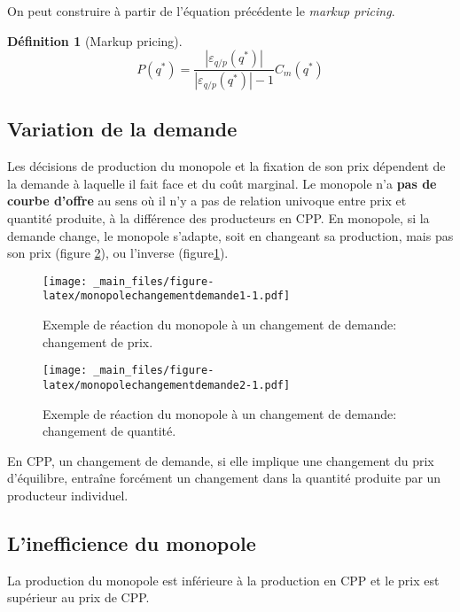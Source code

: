 \documentclass[
]{book}
\theoremstyle{definition}
\newtheorem{definition}{Définition}[chapter]
\theoremstyle{definition}
\theoremstyle{definition}
\theoremstyle{definition}
\theoremstyle{remark}
\begin{document}
On peut construire à partir de l'équation précédente le \emph{markup pricing}.

\begin{definition}[Markup pricing]
\[
P(q^*) =\frac{|\varepsilon_{q/p}(q^*)|}{|\varepsilon_{q/p}(q^*)|-1} C_m(q^*)
\]
\end{definition}

\hypertarget{variation-de-la-demande}{%
\subsection{Variation de la demande}\label{variation-de-la-demande}}

Les décisions de production du monopole et la fixation de son prix dépendent de la demande à laquelle il fait face et du coût marginal.
Le monopole n'a \textbf{pas de courbe d'offre} au sens où il n'y a pas de relation univoque entre prix et quantité produite, à la différence des producteurs en CPP.
En monopole, si la demande change, le monopole s'adapte, soit en changeant sa production, mais pas son prix (figure \ref{fig:monopolechangementdemande2}), ou l'inverse (figure\ref{fig:monopolechangementdemande1}).

\begin{figure}
\centering
\texttt{[image: \_main\_files/figure-latex/monopolechangementdemande1-1.pdf]}
\caption{\label{fig:monopolechangementdemande1}Exemple de réaction du monopole à un changement de demande: changement de prix.}
\end{figure}

\begin{figure}
\centering
\texttt{[image: \_main\_files/figure-latex/monopolechangementdemande2-1.pdf]}
\caption{\label{fig:monopolechangementdemande2}Exemple de réaction du monopole à un changement de demande: changement de quantité.}
\end{figure}

En CPP, un changement de demande, si elle implique une changement du prix d'équilibre, entraîne forcément un changement dans la quantité produite par un producteur individuel.

\hypertarget{linefficience-du-monopole}{%
\subsection{L'inefficience du monopole}\label{linefficience-du-monopole}}

La production du monopole est inférieure à la production en CPP et le prix est supérieur au prix de CPP.
\end{document}
